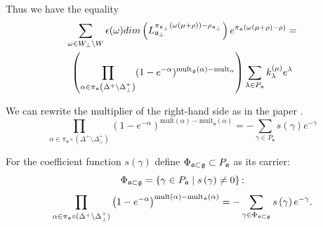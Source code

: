 \documentclass[a4paper,12pt]{article}
\theoremstyle{definition} \newtheorem{Def}{Definition}
\begin{document}
Thus we have the equality
\begin{multline}
  \label{eq:9}
  \sum_{\omega\in W_{\bot}\backslash W} \epsilon(\omega) dim\left(L^{\pi_{\mathfrak{a}_{\bot}}(\omega(\mu+\rho))-\rho_{\mathfrak{a}_{\bot}}}_{\mathfrak{a}_{\bot}}\right) e^{\pi_{\mathfrak{a}}(\omega(\mu+\rho)-\rho)}=\\
  \left(\prod_{\alpha\in \pi_{\mathfrak{a}}\left(\Delta^{+}\setminus \Delta^{+}_{\bot}\right)}(1-e^{-\alpha})^{{\rm mult}_{\mathfrak{g}}(\alpha)-{\rm mult}_{\mathfrak{\alpha}}} \right)
  \sum_{\lambda \in P_{\frak{a}}}k_{\lambda}^{\left( \mu \right) }e^{\lambda } 
\end{multline}

We can rewrite the multiplier of the right-hand side as in the paper \cite{ilyin812pbc}.
\begin{equation}
  \label{eq:11}
    \prod_{\alpha\in \pi_{\mathfrak{a}}\circ (\Delta^{+}\setminus \Delta^{+}_{\bot})} \left(1-e^{-\alpha}\right)^{\mathrm{mult}(\alpha)-\mathrm{mult}_{\mathfrak{a}}(\alpha)}=
     -\sum_{\gamma\in P_{\mathfrak{a}}} s(\gamma)e^{-\gamma}
\end{equation}

For the coefficient function $s\left( \gamma \right) $ define $\Phi _{\frak{a%
}\subset \frak{g}}\subset P_{\frak{a}}$ as its carrier: 
\begin{equation}
\Phi _{\frak{a}\subset \frak{g}}=\left\{ \gamma \in P_{\frak{a}}\mid s\left(
\gamma \right) \neq 0\right\} ;  \label{phi-d}
\end{equation}
\begin{equation}
\prod_{\alpha\in \pi_{\mathfrak{a}}\circ (\Delta^{+}\setminus \Delta^{+}_{\bot})}\left(1-e^{-\alpha }\right) ^{\mathrm{{mult}\left( \alpha \right) -{mult}_{\frak{a}}}\mathrm{\left( \alpha \right) }}=-\sum_{\gamma \in \Phi _{\frak{a}\subset 
\frak{g}}}s\left( \gamma \right) e^{-\gamma }.  \label{fan-d}
\end{equation}
\end{document}
